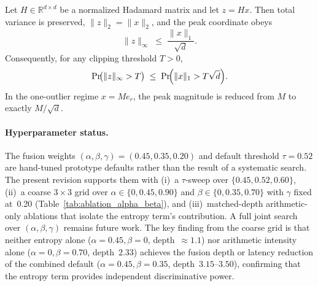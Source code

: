 
\begin{theorem}
\label{thm:quant}
Let $H \in \mathbb{R}^{d \times d}$ be a normalized
Hadamard matrix and let $z = Hx$.
Then total variance is preserved,
$\|z\|_2 = \|x\|_2$,
and the peak coordinate obeys
\[
  \|z\|_\infty \;\le\; \frac{\|x\|_1}{\sqrt{d}}.
\]
Consequently, for any clipping threshold $T > 0$,
\[
  \Pr\!\bigl(\|z\|_\infty > T\bigr)
  \;\le\;
  \Pr\!\Bigl(\|x\|_1 > T\sqrt{d}\Bigr).
\]
In the one-outlier regime $x = M e_r$,
the peak magnitude is reduced from $M$ to exactly
$M/\!\sqrt{d}$.
\end{theorem}



\paragraph{Hyperparameter status.}
The fusion weights $(\alpha,\beta,\gamma) =
(0.45, 0.35, 0.20)$ and default threshold
$\tau = 0.52$ are hand-tuned prototype defaults
rather than the result of a systematic search.
The present revision supports them with
(i)~a $\tau$-sweep over $\{0.45, 0.52, 0.60\}$,
(ii)~a coarse $3\times3$ grid over
$\alpha \in \{0, 0.45, 0.90\}$ and
$\beta \in \{0, 0.35, 0.70\}$ with $\gamma$
fixed at~0.20 (Table~\ref{tab:ablation_alpha_beta}),
and (iii)~matched-depth arithmetic-only ablations that
isolate the entropy term's contribution.
A full joint search over $(\alpha,\beta,\gamma)$ remains
future work.
The key finding from the coarse grid is that neither
entropy alone ($\alpha=0.45,\beta=0$, depth~$\approx1.1$)
nor arithmetic intensity alone ($\alpha=0,\beta=0.70$,
depth~$2.33$) achieves the fusion depth or latency
reduction of the combined default
($\alpha=0.45,\beta=0.35$, depth~$3.15$--$3.50$),
confirming that the entropy term provides independent
discriminative power.


